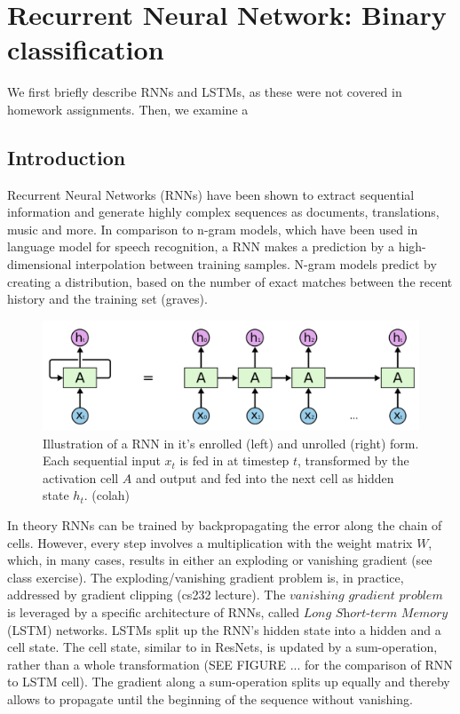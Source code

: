 
\section{Recurrent Neural Network: Binary classification} \label{sec:rnn_clf}

We first briefly describe RNNs and LSTMs, as these were not covered in homework assignments.
Then, we examine a

\subsection{Introduction}

Recurrent Neural Networks (RNNs) have been shown to extract sequential information and generate highly complex sequences as documents, translations, music and more.
In comparison to n-gram models, which have been used in language model for speech recognition, a RNN makes a prediction by a high-dimensional interpolation between training samples.
N-gram models predict by creating a distribution, based on the number of exact matches between the recent history and the training set (graves). 

\begin{figure}
	\centering
	\includegraphics [trim=0 0 0 0, clip, angle=0, width=0.8\columnwidth,
	keepaspectratio]{figures/rnn_unrolled}
	\caption{Illustration of a RNN in it's enrolled (left) and unrolled (right) form. Each sequential input $x_t$ is fed in at timestep $t$, transformed by the activation cell $A$ and output and fed into the next cell as hidden state $h_t$. (colah)} 
	\label{fig:rnn_unrolled} 
\end{figure}

In theory RNNs can be trained by backpropagating the error along the chain of cells.
However, every step involves a multiplication with the weight matrix $W$, which, in many cases, results in either an exploding or vanishing gradient (see class exercise).
The exploding/vanishing gradient problem is, in practice, addressed by gradient clipping (cs232 lecture).
The $\textit{vanishing gradient problem}$ is leveraged by a specific architecture of RNNs, called $\textit{Long Short-term Memory}$ (LSTM) networks.
LSTMs split up the RNN's hidden state into a hidden and a cell state.
The cell state, similar to in ResNets, is updated by a sum-operation, rather than a whole transformation (SEE FIGURE ... for the comparison of RNN to LSTM cell).
The gradient along a sum-operation splits up equally and thereby allows to propagate until the beginning of the sequence without vanishing.

